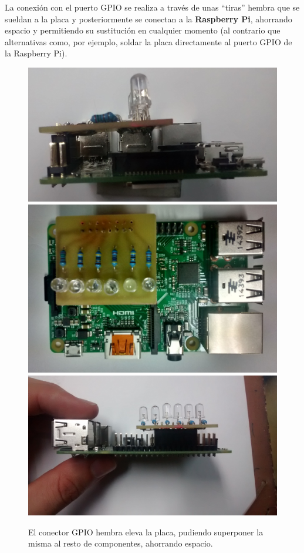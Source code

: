 La conexión con el puerto GPIO se realiza a través de unas ``tiras'' hembra que se sueldan a la placa y posteriormente se conectan a la \textbf{Raspberry Pi}, ahorrando espacio y permitiendo su sustitución en cualquier momento (al contrario que alternativas como, por ejemplo, soldar la placa directamente al puerto GPIO de la Raspberry Pi).

\begin{figure}[H]
\centering
\includegraphics[height=0.116\textheight]{Chapters/Chapter5/Figures/estructuraFinal/pcb3}
\includegraphics[height=0.116\textheight]{Chapters/Chapter5/Figures/estructuraFinal/pcb4}
\includegraphics[height=0.116\textheight]{Chapters/Chapter5/Figures/estructuraFinal/pcb5}
\caption{El conector GPIO hembra eleva la placa, pudiendo superponer la misma al resto de componentes, ahorrando espacio.}
\end{figure}

